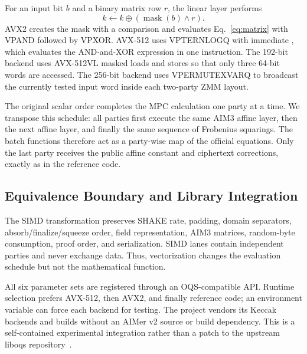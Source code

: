 For an input bit $b$ and a binary matrix row $r$, the linear layer performs
\begin{equation}
  k\leftarrow k\oplus (\operatorname{mask}(b)\wedge r).
  \label{eq:matrix}
\end{equation}
AVX2 creates the mask with a comparison and evaluates Eq.~\eqref{eq:matrix}
with VPAND followed by VPXOR.  AVX-512 uses VPTERNLOGQ with immediate
, which evaluates the AND-and-XOR expression in one instruction.
The 192-bit backend uses AVX-512VL masked loads and stores so that only three
64-bit words are accessed.  The 256-bit backend uses VPERMUTEXVARQ to
broadcast the currently tested input word inside each two-party ZMM layout.

The original scalar order completes the MPC calculation one party at a time.
We transpose this schedule: all parties first execute the same AIM3 affine
layer, then the next affine layer, and finally the same sequence of Frobenius
squarings.  The batch functions therefore act as a party-wise map of the
official equations.  Only the last party receives the public affine constant
and ciphertext corrections, exactly as in the reference code.

\subsection{Equivalence Boundary and Library Integration}
\label{sec:equiv}

The SIMD transformation preserves SHAKE rate, padding, domain separators,
absorb/finalize/squeeze order, field representation, AIM3 matrices, random-byte
consumption, proof order, and serialization.  SIMD lanes contain independent
parties and never exchange data.  Thus, vectorization changes the evaluation
schedule but not the mathematical function.

All six parameter sets are registered through an OQS-compatible API.  Runtime
selection prefers AVX-512, then AVX2, and finally reference code; an environment
variable can force each backend for testing.  The project vendors its Keccak
backends and builds without an AIMer v2 source or build dependency.  This is a
self-contained experimental integration rather than a patch to the upstream
liboqs repository~\cite{openquantumsafe}.
